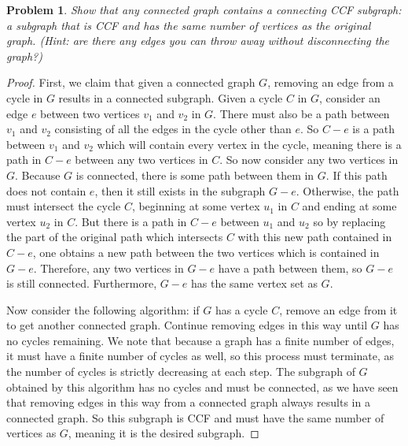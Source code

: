 \documentclass[12pt]{article}
\newtheorem{problem}{Problem}
\begin{document}
\begin{problem}
Show that any connected graph contains a \textit{connecting CCF subgraph}: a subgraph that is CCF and has the same number of vertices as the original graph. (Hint: are there any edges you can throw away without disconnecting the graph?)
\end{problem}

\begin{proof}
First, we claim that given a connected graph $G$, removing an edge from a cycle in $G$ results in a connected subgraph. Given a cycle $C$ in $G$, consider an edge $e$ between two vertices $v_1$ and $v_2$ in $G$. There must also be a path between $v_1$ and $v_2$ consisting of all the edges in the cycle other than $e$. So $C - e$ is a path between $v_1$ and $v_2$ which will contain every vertex in the cycle, meaning there is a path in $C - e$ between any two vertices in $C$. So now consider any two vertices in $G$. Because $G$ is connected, there is some path between them in $G$. If this path does not contain $e$, then it still exists in the subgraph $G - e$. Otherwise, the path must intersect the cycle $C$, beginning at some vertex $u_1$ in $C$ and ending at some vertex $u_2$ in $C$. But there is a path in $C - e$ between $u_1$ and $u_2$ so by replacing the part of the original path which intersects $C$ with this new path contained in $C-e$, one obtains a new path between the two vertices which is contained in $G-e$. Therefore, any two vertices in $G-e$ have a path between them, so $G-e$ is still connected. Furthermore, $G-e$ has the same vertex set as $G$.

Now consider the following algorithm: if $G$ has a cycle $C$, remove an edge from it to get another connected graph. Continue removing edges in this way until $G$ has no cycles remaining. We note that because a graph has a finite number of edges, it must have a finite number of cycles as well, so this process must terminate, as the number of cycles is strictly decreasing at each step. The subgraph of $G$ obtained by this algorithm has no cycles and must be connected, as we have seen that removing edges in this way from a connected graph always results in a connected graph. So this subgraph is CCF and must have the same number of vertices as $G$, meaning it is the desired subgraph.
\end{proof}
\end{document}

